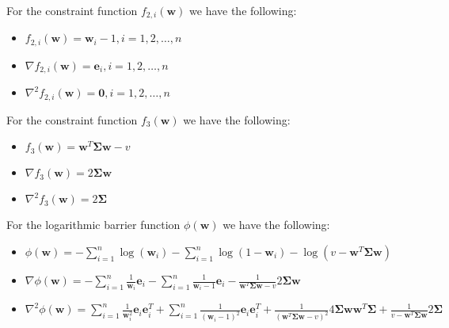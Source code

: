 \documentclass{beamer}
\begin{document}
\begin{frame}

\justifying
For the constraint function $f_{2,i}\left(\mathbf{w}\right)$ we have the following:
\begin{itemize}
	\item $f_{2,i}\left(\mathbf{w}\right) = \mathbf{w}_{i} - 1, i=1,2,\dots,n$
	\item $\nabla f_{2,i}\left(\mathbf{w}\right) = \mathbf{e}_{i}, i=1,2,\dots,n$
	\item $\nabla^{2}f_{2,i}\left(\mathbf{w}\right) = \mathbf{0}, i=1,2,\dots,n$
\end{itemize}

\vspace{0.8cm}
\justifying
For the constraint function $f_{3}\left(\mathbf{w}\right)$ we have the following:
\begin{itemize}
	\item $f_{3}\left(\mathbf{w}\right) = \mathbf{w}^{T}\mathbf{\Sigma}\mathbf{w} - v$
	\item $\nabla f_{3}\left(\mathbf{w}\right) = 2 \mathbf{\Sigma} \mathbf{w}$
	\item $\nabla^{2}f_{3}\left(\mathbf{w}\right) = 2\mathbf{\Sigma}$
\end{itemize}

\vspace{0.8cm}
\justifying
For the logarithmic barrier function $\phi\left(\mathbf{w}\right)$ we have the following:
\scriptsize
\begin{itemize}
	\item $\phi\left(\mathbf{w}\right) = - \sum_{i=1}^{n} \log\left(\mathbf{w}_{i}\right) - \sum_{i=1}^{n} \log\left(1 - \mathbf{w}_{i}\right) - \log\left(v - \mathbf{w}^{T}\mathbf{\Sigma}\mathbf{w} \right) $
	\item $\nabla \phi\left(\mathbf{w}\right) = - \sum_{i=1}^{n} \frac{1}{\mathbf{w}_{i}}\mathbf{e}_{i} - \sum_{i=1}^{n} \frac{1}{\mathbf{w}_{i} - 1} \mathbf{e}_{i} - \frac{1}{\mathbf{w}^{T}\mathbf{\Sigma}\mathbf{w} - v}2\mathbf{\Sigma}\mathbf{w}$
	\item $\nabla^{2}\phi\left(\mathbf{w}\right) = \sum_{i=1}^{n} \frac{1}{\mathbf{w}_{i}^{2}}\mathbf{e}_{i} \mathbf{e}_{i}^{T} + \sum_{i=1}^{n} \frac{1}{\left(\mathbf{w}_{i} - 1\right)^{2}} \mathbf{e}_{i} \mathbf{e}_{i}^{T} + \frac{1}{\left(\mathbf{w}^{T}\mathbf{\Sigma}\mathbf{w} - v\right)^{2}}4\mathbf{\Sigma}\mathbf{w}\mathbf{w}^{T}\mathbf{\Sigma} + \frac{1}{v - \mathbf{w}^{T}\mathbf{\Sigma}\mathbf{w}}2\mathbf{\Sigma}$
\end{itemize}

\end{frame}
\end{document}
